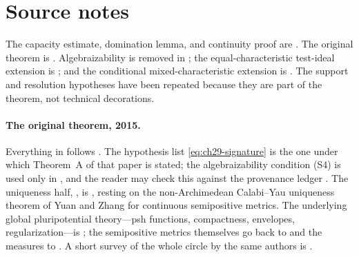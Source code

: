 \section*{Source notes}

The capacity estimate, domination lemma, and continuity proof are
\cite[Lemmas~8.3--8.4 and \S8.3]{BFJ15}.  The original theorem is
\cite[Theorem~8.1]{BFJ15}.  Algebraizability is removed in
\cite{BGGJKM20}; the equal-characteristic test-ideal extension is
\cite{GJKM19}; and the conditional mixed-characteristic extension is
\cite{FGK25}.  The support and resolution hypotheses have been repeated
because they are part of the theorem, not technical decorations.

\paragraph{The original theorem, 2015.}
Everything in  follows
\cite[\S8]{BFJ15}.  The hypothesis list \eqref{eq:ch29-signature} is the one
under which Theorem~A of that paper is stated; the algebraizability
condition \textup{(S4)} is used only in
\cite[Appendix~A]{BFJ15}, and the reader may check this against the
provenance ledger .  The uniqueness half,
, is \cite[\S8]{BFJ15}, resting on the
non-Archimedean Calabi--Yau uniqueness theorem of Yuan and Zhang for
continuous semipositive metrics.  The underlying global pluripotential
theory---psh functions, compactness, envelopes, regularization---is
\cite{BFJ16}; the semipositive metrics themselves go back to
\cite{Zhang1995} and the measures to \cite{CL06}.  A short survey of the
whole circle by the same authors is \cite{BFJ16b}.

